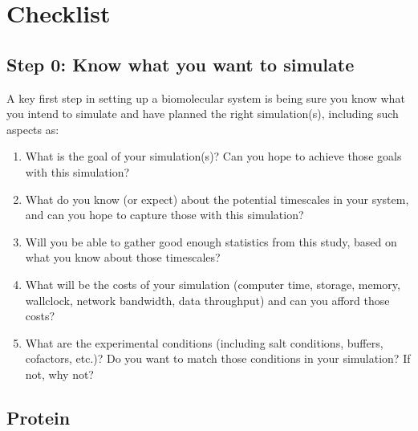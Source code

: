 \documentclass[9pt]{livecoms}
\begin{document}
\section{Checklist}

\subsection{ Step 0: Know what you want to simulate }

A key first step in setting up a biomolecular system is being sure you know what you intend to simulate and have planned the right simulation(s), including such aspects as:
\begin{enumerate}
\item What is the goal of your simulation(s)? Can you hope to achieve those goals with this simulation?
\item What do you know (or expect) about the potential timescales in your system, and can you hope to capture those with this simulation?
\item Will you be able to gather good enough statistics from this study, based on what you know about those timescales?
\item What will be the costs of your simulation (computer time, storage, memory, wallclock, network bandwidth, data throughput) and can you afford those costs? 
\item What are the experimental conditions (including salt conditions, buffers, cofactors, etc.)? Do you want to match those conditions in your simulation? If not, why not?
\end{enumerate}


\subsection{Protein} 
\end{document}
